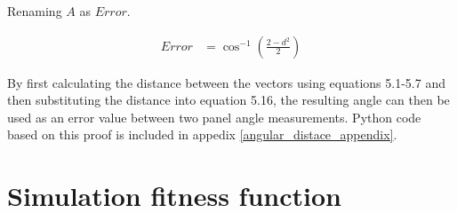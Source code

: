 \noindent Renaming $A$ as $Error$.

\begin{align}
	Error &= \cos^{-1}(\frac{2-d^2}{2}) \label{errorangle}
\end{align}


\noindent By first calculating the distance between the vectors using equations 5.1-5.7 and then substituting the distance into equation 5.16, the resulting angle can then be used as an error value between two panel angle measurements. Python code based on this proof is included in appedix \ref{angular_distace_appendix}.




\vspace{5mm}





\newpage
\section{Simulation fitness function}
\label{section_simulation_error_function}


